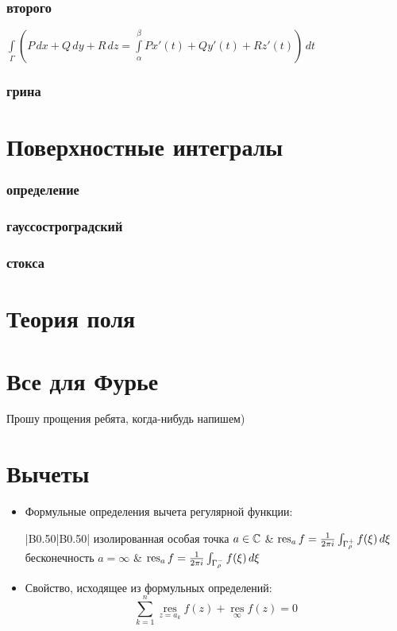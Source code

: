 \subsubsection{второго}
$\int\limits_{\Gamma} \left(P\,dx+Q\,dy+R\,dz=\int\limits_{\alpha}^{\beta} P x'(t)+ Q y'(t)+ R z'(t)\right)\,dt$
\subsubsection{грина}


\section{Поверхностные интегралы}
\subsubsection{определение}
\subsubsection{гауссостроградский}
\subsubsection{стокса}

\section{Теория поля}

\section{Все для Фурье}

Прошу прощения ребята, когда-нибудь напишем)

\section{Вычеты}
\begin{itemize}
\item 
Формульные определения вычета регулярной функции:
\footnotesize
\begin{longtable}[c]{|B{0.5}{0}|B{0.5}{0}|}
\hline
изолированная особая точка $a\in\mathbb{C}$ & $\operatorname*{res}_a f=\frac{1}{2\pi i} \int_{\Gamma_{\rho}^{+}} f(\xi)\, d\xi$ \tabularnewline\hline
бесконечность $a=\infty$ &  $\operatorname*{res}_a f=\frac{1}{2\pi i} \int_{\Gamma_{\rho}^{-}} f(\xi)\, d\xi$ \tabularnewline\hline
\end{longtable}
\normalsize
\item
Свойство, исходящее из формульных определений:
$$
\sum _{k=1}^{n}\mathop {\mathrm {res} } \limits _{z=a_{k}}f(z) + \mathop {\mathrm {res}} \limits _{\infty } f(z) = 0
$$
\end{itemize}

